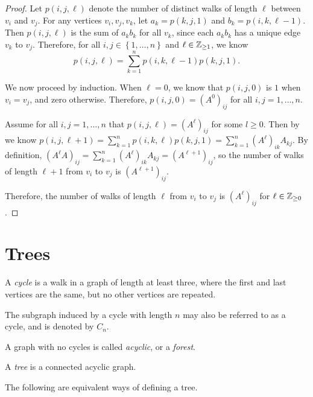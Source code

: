 \begin{proof}
Let $p(i, j, \ell)$ denote the number of distinct walks of length $\ell$ between $v_i$ and $v_j$. For any vertices $v_i, v_j, v_k$, let $a_k = p(k, j, 1)$ and $b_k = p(i, k, \ell-1)$. Then $p(i, j, \ell)$ is the sum of $a_kb_k$ for all $v_k$, since each $a_kb_k$ has a unique edge $v_k$ to $v_j$. Therefore, for all $i, j \in \left\{1, \ldots, n\right\}$ and $\ell \in \mathbb{Z}_{\geq 1}$, we know \[p(i, j, \ell) = \sum_{k=1}^n p(i,k,\ell-1)p(k,j,1).\]

We now proceed by induction. When $\ell = 0$, we know that $p(i, j, 0)$ is $1$ when $v_i = v_j$, and zero otherwise. Therefore, $p(i, j, 0) = (A^0)_{ij}$ for all $i, j = 1,\ldots,n$.

Assume for all $i, j = 1,\ldots,n$ that $p(i, j, \ell) = (A^\ell)_{ij}$ for some $l \geq 0$. Then by we know $p(i, j, \ell + 1) = \sum_{k=1}^n p(i, k, \ell)p(k, j, 1) = \sum_{k=1}^n (A^\ell)_{ik}A_{kj}$. By definition, $(A^\ell A)_{ij} = \sum_{k=1}^n (A^\ell)_{ik}A_{kj} = (A^{\ell+1})_{ij}$, so the number of walks of length $\ell+1$ from $v_i$ to $v_j$ is $(A^{\ell+1})_{ij}$.

Therefore, the number of walks of length $\ell$ from $v_i$ to $v_j$ is $(A^{\ell})_{ij}$ for $\ell \in \mathbb{Z}_{\geq 0}$.
\end{proof}

\section{Trees}

\begin{defn}
    A \emph{cycle} is a walk in a graph of length at least three, where the first and last vertices are the same, but no other vertices are repeated.
\end{defn}

\begin{rmk}
    The subgraph induced by a cycle with length $n$ may also be referred to as a cycle, and is denoted by $C_n$.
\end{rmk}

\begin{defn}
    A graph with no cycles is called \emph{acyclic}, or a \emph{forest}.
\end{defn}

\begin{defn}
    A \emph{tree} is a connected acyclic graph.
\end{defn}

\begin{rmk}
    The following are equivalent ways of defining a tree.
\end{rmk}

